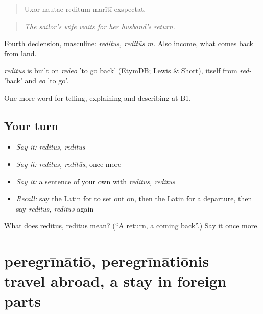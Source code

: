 \begin{quote}
Uxor nautae reditum marītī exspectat.
\end{quote}

\begin{quote}
\emph{The sailor's wife waits for her husband's return.}
\end{quote}

Fourth declension, masculine: \emph{reditus, reditūs m.} Also income, what comes back from land.

\begin{cousinweb}
\emph{reditus} is built on \emph{redeō} 'to go back' (EtymDB; Lewis \& Short), itself from \emph{red-} 'back' and \emph{eō} 'to go'.
\end{cousinweb}

\begin{grammarlens}[title={What you've built}]
One more word for telling, explaining and describing at B1.
\end{grammarlens}

\subsection*{Your turn}
\begin{itemize}
\raggedright
  \item \emph{Say it:} \emph{reditus, reditūs}
  \item \emph{Say it:} \emph{reditus, reditūs}, once more
  \item \emph{Say it:} a sentence of your own with \emph{reditus, reditūs}
  \item \emph{Recall:} say the Latin for to set out on, then the Latin for a departure, then say \emph{reditus, reditūs} again
\end{itemize}

\begin{tcolorbox}[breakable,colback=teal!4,colframe=teal!35!black,title={Before you move on}]
What does reditus, reditūs mean? (\textquotedblleft{}A return, a coming back\textquotedblright{}.) Say it once more.
\end{tcolorbox}
\section[peregrīnātiō, peregrīnātiōnis]{peregrīnātiō, peregrīnātiōnis — travel abroad, a stay in foreign parts}

\label{lesson:LA-C428-peregrinatio}




